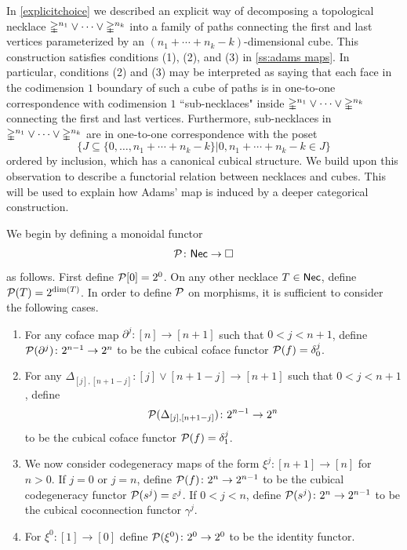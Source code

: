 In \cref{explicitchoice} we described an explicit way of decomposing a topological necklace $\mathbb{\Delta}^{n_1} \vee \cdots \vee \mathbb{\Delta}^{n_k}$ into a family of paths connecting the first and last vertices parameterized by an $(n_1 + \cdots + n_k-k)$-dimensional cube. This construction satisfies conditions (1), (2), and (3) in \cref{ss:adams maps}. In particular, conditions (2) and (3) may be interpreted as saying that each face in the codimension $1$ boundary of such a cube of paths is in one-to-one correspondence with codimension $1$ ``sub-necklaces" inside $\mathbb{\Delta}^{n_1} \vee \cdots \vee \mathbb{\Delta}^{n_k}$ connecting the first and last vertices. Furthermore, sub-necklaces in $\mathbb{\Delta}^{n_1} \vee \cdots \vee \mathbb{\Delta}^{n_k}$ are in one-to-one correspondence with the poset \[\{ J \subseteq \{0,\ldots, n_1+ \cdots + n_k-k\} | 0,n_1+ \cdots +n_k-k \in J \}\]
ordered by inclusion, which has a canonical cubical structure. We build upon this observation to describe a functorial relation between necklaces and cubes. This will be used to explain how Adams' map is induced by a deeper categorical construction.

We begin by defining a monoidal functor
\[
\mathcal{P} \colon \mathsf{Nec} \to \square
\]
as follows.
First define $\mathcal{P}[0] = 2^0$.
On any other necklace $T \in \mathsf{Nec}$, define $\mathcal{P}(T) = 2^{\dim(T)}$.
In order to define $\mathcal{P}$ on morphisms, it is sufficient to consider the following cases.
\begin{enumerate}
	\item For any coface map $\partial^j \colon [n] \to [n+1]$ such that $0< j<{n+1}$, define $\mathcal{P}(\partial^j) \colon 2^{n-1}\to 2^{n}$ to be the cubical coface functor $\mathcal{P}(f)= \delta_0^{j}$.

	\item For any $\Delta_{[j], [n+1-j]} \colon [j] \vee [n+1-j] \to [n+1]$ such that $0<j<n+1$, define
	\[
	\mathcal{P}(\Delta_{[j], [n+1-j]}) \colon 2^{n-1}\to 2^{n}
	\]
	to be the cubical coface functor $\mathcal{P}(f)=\delta_1^{j}$.

	\item We now consider codegeneracy maps of the form $\xi^j \colon [n+1] \to [n]$ for $n>0$.
	If $j=0$ or $j=n$, define $\mathcal{P}(f) \colon 2^n \to 2^{n-1}$ to be the cubical codegeneracy functor $\mathcal{P}(s^j)= \varepsilon^{j}$.
	If $0<j<n$, define $\mathcal{P}(s^j) \colon 2^n \to 2^{n-1}$ to be the cubical coconnection functor $\gamma^{j}$.

	\item For $\xi^0 \colon [1] \to [0]$ define $\mathcal{P}(\xi^0) \colon 2^0 \to 2^0$ to be the identity functor.
\end{enumerate}

